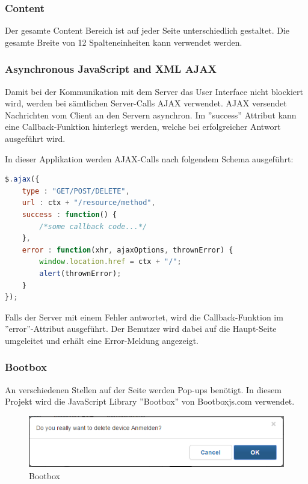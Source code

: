 \subsubsection{Content}
Der gesamte Content Bereich ist auf jeder Seite unterschiedlich gestaltet. Die gesamte Breite von 12 Spalteneinheiten kann verwendet werden.

\subsubsection{Asynchronous JavaScript and XML AJAX}
Damit bei der Kommunikation mit dem Server das User Interface nicht blockiert wird, werden bei sämtlichen Server-Calls AJAX verwendet. AJAX versendet Nachrichten vom Client an den Servern asynchron. Im ''success'' Attribut kann eine Callback-Funktion hinterlegt werden, welche bei erfolgreicher Antwort ausgeführt wird.

In dieser Applikation werden AJAX-Calls nach folgendem Schema ausgeführt:
\begin{lstlisting}[language=js]
$.ajax({
	type : "GET/POST/DELETE",
	url : ctx + "/resource/method",
	success : function() {
		/*some callback code...*/
	},
	error : function(xhr, ajaxOptions, thrownError) {
		window.location.href = ctx + "/";
		alert(thrownError);
	}
});
\end{lstlisting}

Falls der Server mit einem Fehler antwortet, wird die Callback-Funktion im ''error''-Attribut ausgeführt. Der Benutzer wird dabei auf die Haupt-Seite umgeleitet und erhält eine Error-Meldung angezeigt.

\subsubsection{Bootbox}
An verschiedenen Stellen auf der Seite werden Pop-ups benötigt. In diesem Projekt wird die JavaScript Library ''Bootbox'' von Bootboxjs.com verwendet.

\begin{figure}[H]
\centering
\includegraphics[scale=0.9]{../04_Realisierung/images/userinterface/bootbox.png}
\caption{Bootbox}
\end{figure}

